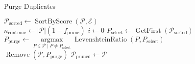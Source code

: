 \begin{algorithm}
    \caption{Purge Duplicates}
    \label{alg:duplicpurge}
    $\mathscr{P}_{\text{sorted}} \gets \operatorname{SortByScore}(\mathscr{P}, \mathcal{E})$ \\
    $n_{\text{continue}} \gets \vert\mathscr{P}\vert(1-f_{\text{prune}})$
    $i \gets 0$
     {
        $P_{\text{select}} \gets \operatorname{GetFirst}(\mathscr{P}_{\text{sorted}})$ \\ 
        $P_{\text{purge}} \gets \underset{P\in\mathscr{P}\mid P \neq P_{\text{select}}}{\operatorname{argmax}} \operatorname{LevenshteinRatio}(P, P_{\text{select}})$ \\
        $\operatorname{Remove}(\mathscr{P}, P_{\text{purge}})$
    }
    $\mathscr{P}_{\text{pruned}} \gets \mathscr{P}$\\
\end{algorithm}
